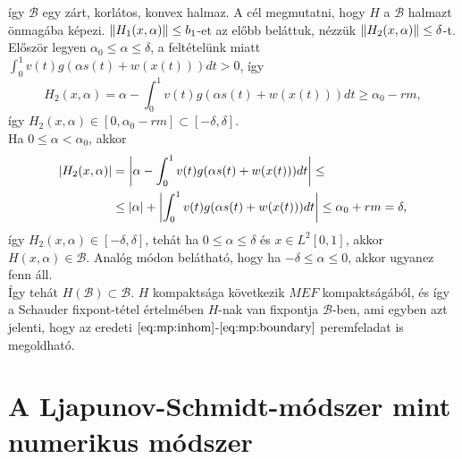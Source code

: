 \documentclass[oneside, titlepage, 12pt, a4paper]{report}
\DeclarePairedDelimiter\norm{\lVert}{\rVert}	%
\DeclarePairedDelimiter\abs{\lvert}{\rvert}	%
\begin{document}
így $\mathcal{B}$ egy zárt, korlátos, konvex halmaz. A cél megmutatni, hogy $H$ a $\mathcal{B}$ halmazt önmagába képezi. $\norm{H_1(x, \alpha)} \leq b_1$-et az előbb beláttuk, nézzük $\norm{H_2(x, \alpha)} \leq \delta$-t. \\
Először legyen $\alpha_0 \leq \alpha \leq \delta$, a feltételünk miatt $\int_0^1 v(t) g(\alpha s(t) + w(x(t))) dt > 0$, így
\begin{equation*}
H_2(x, \alpha) = \alpha - \int_0^1 v(t) g(\alpha s(t) + w(x(t))) dt \geq \alpha_0 - rm,
\end{equation*}
így $H_2(x, \alpha) \in [0, \alpha_0 - rm] \subset [-\delta, \delta]$. \\
Ha $0 \leq \alpha < \alpha_0$, akkor
\begin{align*}
\abs{H_2(x, \alpha)} &= \abs*{ \alpha - \int_0^1 v(t) g(\alpha s(t) + w(x(t))) dt } \leq \\
 &\leq \abs{\alpha} + \abs*{\int_0^1 v(t) g(\alpha s(t) + w(x(t))) dt} \leq \alpha_0 + rm = \delta,
\end{align*}
így $H_2(x, \alpha) \in [-\delta, \delta]$, tehát ha $0 \leq \alpha \leq \delta$ és $x \in L^2[0, 1]$, akkor $H(x, \alpha) \in \mathcal{B}$. Analóg módon belátható, hogy ha $-\delta \leq \alpha \leq 0$, akkor ugyanez fenn áll. \\
Így tehát $H(\mathcal{B}) \subset \mathcal{B}$. $H$ kompaktsága következik $M E F$ kompaktságából, és így a Schauder fixpont-tétel értelmében $H$-nak van fixpontja $\mathcal{B}$-ben, ami egyben azt jelenti, hogy az eredeti $\eqref{eq:mp:inhom}$-$\eqref{eq:mp:boundary}$ peremfeladat is megoldható.



\onehalfspacing
\chapter{A Ljapunov-Schmidt-módszer mint numerikus módszer}
\label{chap:numeric}
\end{document}
